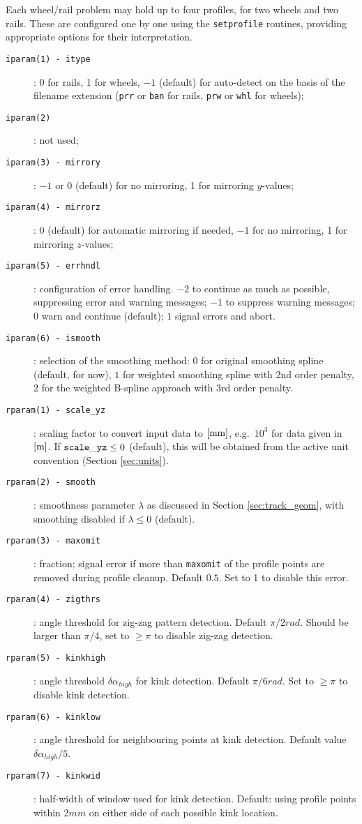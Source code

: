 \documentclass[12pt]{report}
\begin{document}
Each wheel/rail problem may hold up to four profiles, for two wheels and
two rails. These are configured one by one using the {\tt setprofile}
routines, providing appropriate options for their interpretation.
\begin{description}
\item[\tt iparam(1) - itype]: 0 for rails, 1 for wheels, $-1$ (default)
        for auto-detect on the basis of the filename extension ({\tt prr}
        or {\tt ban} for rails, {\tt prw} or {\tt whl} for wheels);
\item[\tt iparam(2)]: not used;
\item[\tt iparam(3) - mirrory]: $-1$ or 0 (default) for no mirroring, 
        1 for mirroring $y$-values;
\item[\tt iparam(4) - mirrorz]: 0 (default) for automatic mirroring if
        needed, $-1$ for no mirroring, 1 for mirroring $z$-values;
\item[\tt iparam(5) - errhndl]: configuration of error handling.
        $-2$ to continue as much as possible, suppressing error and warning
        messages; $-1$ to suppress warning messages; $0$ warn and continue
        (default); $1$ signal errors and abort.
\item[\tt iparam(6) - ismooth]: selection of the smoothing
        method: $0$ for original smoothing spline (default, for now), $1$
        for weighted smoothing spline with 2nd order penalty, $2$ for
        the weighted B-spline approach with 3rd order penalty.
\item[\tt rparam(1) - scale\_yz]: scaling factor to convert input data
        to $[\mathrm{mm}]$, e.g.\ $10^3$ for data given in $[\mathrm{m}]$. If ${\tt
        scale\_yz}\le 0$ (default), this will be obtained from the active unit
        convention (Section \ref{sec:units}).
\item[\tt rparam(2) - smooth]: smoothness parameter $\lambda$ as
        discussed in Section \ref{sec:track_geom}, with smoothing disabled
        if $\lambda\le 0$ (default).
\item[\tt rparam(3) - maxomit]: fraction; signal error if more
        than {\tt maxomit} of the profile points are removed during
        profile cleanup. Default $0.5$. Set to 1 to disable this error.
\item[\tt rparam(4) - zigthrs]: angle threshold for zig-zag pattern
        detection. Default $\pi/2\unit{rad}$. Should be larger than
        $\pi/4$, set to $\ge\pi$ to disable zig-zag detection.
\item[\tt rparam(5) - kinkhigh]: angle threshold $\delta\alpha_{high}$ for
        kink detection. Default $\pi/6\unit{rad}$. Set to $\ge\pi$ to disable
        kink detection.
\item[\tt rparam(6) - kinklow]: angle threshold for neighbouring points at
        kink detection. Default value $\delta\alpha_{high}/5$.
\item[\tt rparam(7) - kinkwid]: half-width of window used for kink detection.
        Default: using profile points within $2\unit{mm}$ on either side of
        each possible kink location.
\end{description}
\end{document}
